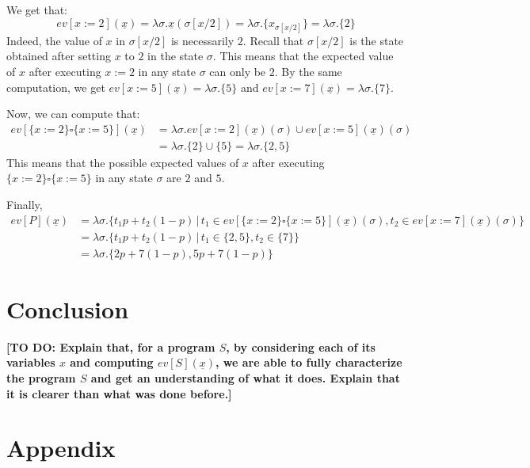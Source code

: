 \documentclass[a4paper,10pt]{llncs}
\newcommand\todo[1]{{\color{red}\textbf{[TO DO:  #1]}}}
\begin{document}
We get that:
$$ev[x := 2](\underline{x}) = \lambda\sigma.\underline{x}(\sigma[x/2]) = \lambda\sigma.\{x_{\sigma[x/2]}\} = \lambda\sigma.\{2\}$$ 
Indeed, the value of $x$ in $\sigma[x/2]$ is necessarily $2$. Recall that $\sigma[x/2]$ is the state obtained after setting $x$ to $2$ in the state $\sigma$. This means that the expected value of $x$ after executing $x := 2$ in any state $\sigma$ can only be $2$. By the same computation, we get $ev[x := 5](\underline{x}) = \lambda\sigma.\{5\}$ and $ev[x := 7](\underline{x}) = \lambda\sigma.\{7\}$.\newline

Now, we can compute that:
\begin{align*}
ev[\{x := 2\} \square \{x := 5\}](\underline{x}) &= \lambda\sigma. ev[x := 2](\underline{x})(\sigma) \cup ev[x := 5](\underline{x})(\sigma) \\
&= \lambda\sigma. \{2\} \cup \{5\} = \lambda\sigma.\{2,5\} 
\end{align*}
This means that the possible expected values of $x$ after executing $\{x := 2\} \square \{x := 5\}$ in any state $\sigma$ are $2$ and $5$.\newline

Finally, 
\begin{align*}
ev[P](\underline{x}) &= \lambda\sigma.\{t_1 p+t_2(1-p) \,|\, t_1 \in ev[\{x := 2\} \square \{x := 5\}](\underline{x})(\sigma), t_2 \in ev[x := 7](\underline{x})(\sigma) \} \\
&= \lambda\sigma.\{t_1 p+t_2(1-p) \,|\, t_1 \in \{2,5\}, t_2 \in \{7\} \} \\
&= \lambda\sigma. \{2p+7(1-p),5p+7(1-p) \} 
\end{align*}



\section{Conclusion}
\todo{Explain that, for a program $S$, by considering each of its variables $x$ and computing $ev[S](\underline{x})$, we are able to fully characterize the program $S$ and get an understanding of what it does. Explain that it is clearer than what was done before.}
\label{sec:conclusion}


{}


\newpage
\section{Appendix}
\label{sec:appendix}
\end{document}
